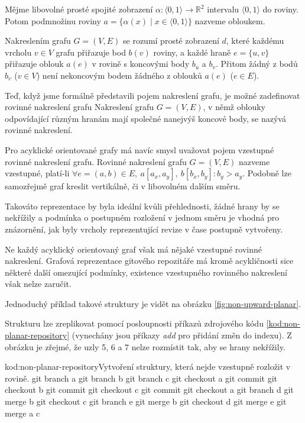 \documentclass[
  biblatex,
  glossaries,
  index
]{kidiplom}
\begin{document}
\begin{definition}
Mějme libovolné prosté spojité zobrazení $\alpha\colon\langle 0,1\rangle\to\mathbb{R}^2$ intervalu $\langle 0,1\rangle$ do roviny. Potom podmnožinu roviny $a=\{\alpha(x)\mid x\in\langle 0,1\rangle\}$ nazveme obloukem.
\end{definition}

\begin{definition}
Nakreslením grafu $G=(V,E)$ se rozumí prosté zobrazení $d$, které každému vrcholu $v\in V$ grafu přiřazuje bod $b(v)$ roviny, a každé hraně $e=\{u,v\}$ přiřazuje oblouk $a(e)$ v rovině s koncovými body $b_u$ a $b_v$. Přitom žádný z bodů $b_v$ ($v\in V$) není
nekoncovým bodem žádného z oblouků $a(e)$ ($e\in E$).
\end{definition}

Teď, když jsme formálně představili pojem nakreslení grafu, je možné zadefinovat rovinné nakreslení grafu
Nakreslení grafu $G = (V,E)$, v němž oblouky odpovídající různým hranám mají
společné nanejvýš koncové body, se nazývá rovinné nakreslení.

Pro acyklické orientované grafy má navíc smysl uvažovat pojem vzestupné rovinné nakreslení grafu. Rovinné nakreslení grafu $G=(V,E)$ nazveme vzestupné, platí-li $\forall e=(a, b)\in E,\ a[a_x,a_y],\ b[b_x,b_y]\colon b_y > a_y$. Podobně lze samozřejmě graf kreslit vertikálně, či v libovolném dalším směru.

Takováto reprezentace by byla ideální kvůli přehlednosti, žádné hrany by se nekřížily a podmínka o postupném rozložení v jednom směru je vhodná pro znázornění, jak byly vrcholy reprezentující revize v čase postupně vytvořeny.

Ne každý acyklický orientovaný graf však má nějaké vzestupné rovinné nakreslení. Grafová reprezentace gitového repozitáře má kromě acykličnosti sice některé další omezující podmínky, existence vzestupného rovinného nakreslení však nelze zaručit.

Jednoduchý příklad takové struktury je vidět na obrázku \ref{fig:non-upward-planar}.

Strukturu lze zreplikovat pomocí posloupnosti příkazů zdrojového kódu \ref{kod:non-planar-repository} (vynechány jsou příkazy {\it add} pro přidání změn do indexu).
Z obrázku je zřejmé, že uzly 5, 6 a 7 nelze rozmístit tak, aby se hrany nekřížily.

\begin{kicode}{}{kod:non-planar-repository}{Vytvoření struktury, která nejde vzestupně rozložit v rovině.}
git branch a
git branch b
git branch c
git checkout a
git commit
git checkout b
git commit
git checkout c
git commit
git checkout a
git branch d
git merge b
git checkout c
git branch e
git merge b
git checkout d
git merge e
git merge a c
\end{kicode}
\end{document}
